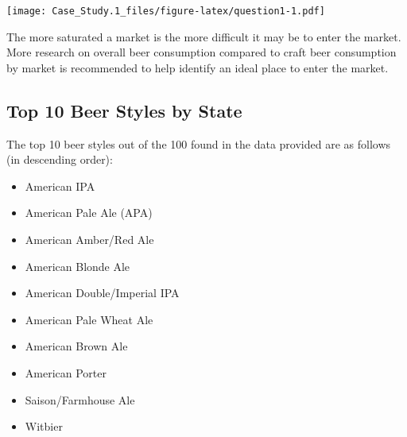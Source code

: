 \documentclass[]{article}
\newenvironment{Shaded}{\begin{snugshade}}{\end{snugshade}}
\newcommand{\DataTypeTok}[1]{\textcolor[rgb]{0.13,0.29,0.53}{#1}}
\newcommand{\DecValTok}[1]{\textcolor[rgb]{0.00,0.00,0.81}{#1}}
\newcommand{\FloatTok}[1]{\textcolor[rgb]{0.00,0.00,0.81}{#1}}
\newcommand{\KeywordTok}[1]{\textcolor[rgb]{0.13,0.29,0.53}{\textbf{#1}}}
\newcommand{\NormalTok}[1]{#1}
\newcommand{\OperatorTok}[1]{\textcolor[rgb]{0.81,0.36,0.00}{\textbf{#1}}}
\newcommand{\OtherTok}[1]{\textcolor[rgb]{0.56,0.35,0.01}{#1}}
\newcommand{\StringTok}[1]{\textcolor[rgb]{0.31,0.60,0.02}{#1}}
\providecommand{\tightlist}{%
  \setlength{\itemsep}{0pt}\setlength{\parskip}{0pt}}
\begin{document}
\begin{Shaded}
\end{Shaded}

\texttt{[image: Case\_Study.1\_files/figure-latex/question1-1.pdf]}

The more saturated a market is the more difficult it may be to enter the
market. More research on overall beer consumption compared to craft beer
consumption by market is recommended to help identify an ideal place to
enter the market.

\hypertarget{top-10-beer-styles-by-state}{%
\subsection{Top 10 Beer Styles by
State}\label{top-10-beer-styles-by-state}}

The top 10 beer styles out of the 100 found in the data provided are as
follows (in descending order):

\begin{itemize}
\tightlist
\item
  American IPA
\item
  American Pale Ale (APA)
\item
  American Amber/Red Ale
\item
  American Blonde Ale
\item
  American Double/Imperial IPA
\item
  American Pale Wheat Ale
\item
  American Brown Ale
\item
  American Porter
\item
  Saison/Farmhouse Ale
\item
  Witbier
\end{itemize}
\end{document}
